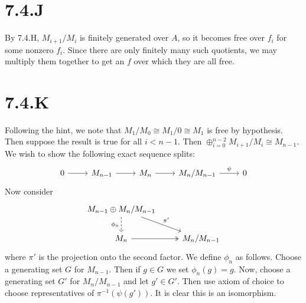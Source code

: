 \documentclass{article}
\begin{document}
\section{7.4.J}
By 7.4.H, $M_{i+1}/M_i$ is finitely generated over
$A$, so it becomes free over $f_i$ for
some nonzero $f_i$. Since there are only finitely many such
quotients, we may multiply them together to get an $f$ over
which they are all free.

\section{7.4.K}
Following the hint, we note that $M_1/M_0 \cong M_1/0 \cong M_1$ is free by hypothesis.
Then suppose the result is true for all $i < n-1$. Then
$\oplus_{i=0}^{n-2} M_{i+1}/M_i \cong
    M_{n-1}$. We wish to show the following exact sequence splits:
\[
    \begin{tikzcd}
        0 \ar[r] & M_{n-1} \ar[r] & M_n \ar[r] & M_n/M_{n-1} \ar[r, "\psi"] & 0
    \end{tikzcd}
\]  Now consider \[
    \begin{tikzcd}
        {M_{n-1}\oplus M_n/M_{n-1}} \\{M_n} & {M_n/M_{n-1}}
        \arrow["\pi'",from=1-1, to=2-2]
        \arrow[two heads, from=2-1, to=2-2]
        \arrow["\phi_n"', dashed, from=1-1, to=2-1]
    \end{tikzcd}
\] where
$\pi'$ is the projection onto the second factor. We define
$\phi_n$ as follows. Choose a generating set
$G$ for $M_{n-1}$. Then if
$g \in G$ we set $\phi_n(g)=g$. Now, choose a
generating set $G'$ for $M_n/M_{n-1}$ and let
$g' \in G'$. Then use axiom of choice to choose representatives of
$\pi^{-1}(\psi(g'))$. It is clear this is an isomorphism.
\end{document}
